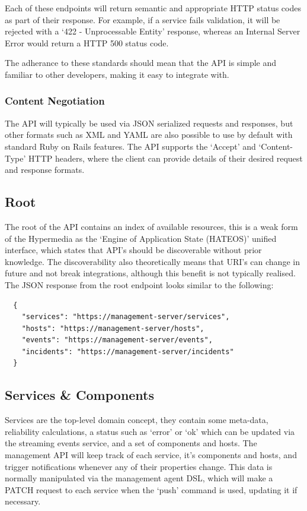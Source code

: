\documentclass{cshonours}
\begin{document}
Each of these endpoints will return semantic and appropriate HTTP status codes as part of their response. For example, if a service fails validation, it will be rejected with a `422 - Unprocessable Entity' response, whereas an Internal Server Error would return a HTTP 500 status code.

The adherance to these standards should mean that the API is simple and familiar to other developers, making it easy to integrate with.

\subsubsection{Content Negotiation}

The API will typically be used via JSON serialized requests and responses, but other formats such as XML and YAML are also possible to use by default with standard Ruby on Rails features. The API supports the `Accept' and `Content-Type' HTTP headers, where the client can provide details of their desired request and response formats.

\subsection{Root}

The root of the API contains an index of available resources, this is a weak form of the Hypermedia as the `Engine of Application State (HATEOS)' unified interface, which states that API's should be discoverable without prior knowledge. The discoverability also theoretically means that URI's can change in future and not break integrations, although this benefit is not typically realised. The JSON response from the root endpoint looks similar to the following:

\begin{listing}[h]
\begin{verbatim}
  {
    "services": "https://management-server/services",
    "hosts": "https://management-server/hosts",
    "events": "https://management-server/events",
    "incidents": "https://management-server/incidents"
  }
\end{verbatim}
\end{listing}

\subsection{Services \& Components}

Services are the top-level domain concept, they contain some meta-data, reliability calculations, a status such as `error' or `ok' which can be updated via the streaming events service, and a set of components and hosts. The management API will keep track of each service, it's components and hosts, and trigger notifications whenever any of their properties change. This data is normally manipulated via the management agent DSL, which will make a PATCH request to each service when the `push' command is used, updating it if necessary.
\end{document}
